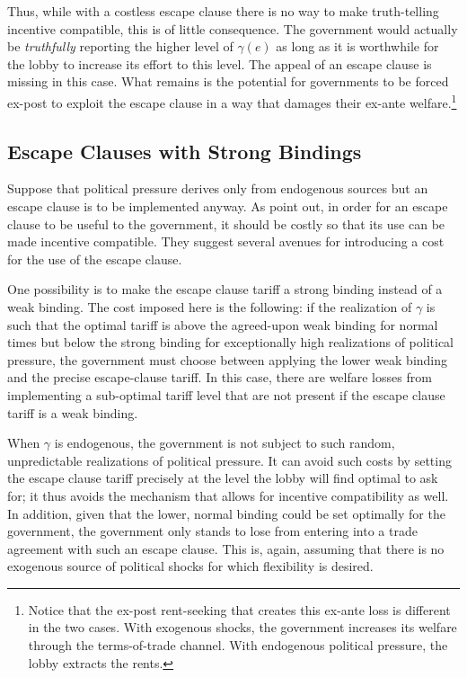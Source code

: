 \documentclass[12pt,titlepage]{article}
\newcommand{\ga}{\gamma}
\begin{document}
Thus, while with a costless escape clause there is no way to make truth-telling incentive compatible, this is of little consequence. The government would actually be \textit{truthfully} reporting the higher level of $\ga(e)$ as long as it is worthwhile for the lobby to increase its effort to this level. The appeal of an escape clause is missing in this case. What remains is the potential for governments to be forced ex-post to exploit the escape clause in a way that damages their ex-ante welfare.\footnote{Notice that the ex-post rent-seeking that creates this ex-ante loss is different in the two cases. With exogenous shocks, the government increases its welfare through the terms-of-trade channel. With endogenous political pressure, the lobby extracts the rents.}

\subsection{Escape Clauses with Strong Bindings}
\label{sec:strong}
Suppose that political pressure derives only from endogenous sources but an escape clause is to be implemented anyway. As \Textcite{bs2005} point out, in order for an escape clause to be useful to the government, it should be costly so that its use can be made incentive compatible. They suggest several avenues for introducing a cost for the use of the escape clause.

One possibility is to make the escape clause tariff a strong binding instead of a weak binding. The cost imposed here is the following: if the realization of $\ga$ is such that the optimal tariff is above the agreed-upon weak binding for normal times but below the strong binding for exceptionally high realizations of political pressure, the government must choose between applying the lower weak binding and the precise escape-clause tariff. In this case, there are welfare losses from implementing a sub-optimal tariff level that are not present if the escape clause tariff is a weak binding.

When $\ga$ is endogenous, the government is not subject to such random, unpredictable realizations of political pressure. It can avoid such costs by setting the escape clause tariff precisely at the level the lobby will find optimal to ask for; it thus avoids the mechanism that allows for incentive compatibility as well. In addition, given that the lower, normal binding could be set optimally for the government, the government only stands to lose from entering into a trade agreement with such an escape clause. This is, again, assuming that there is no exogenous source of political shocks for which flexibility is desired.
\end{document}
